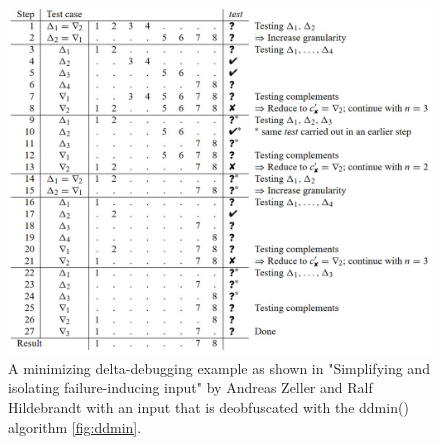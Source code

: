 \begin{figure}
	\centering
	\includegraphics[width=1.0\textwidth]{images/ddminExampleFromPaper5}
	\caption{A minimizing delta-debugging example as shown in "Simplifying and isolating failure-inducing input" by Andreas Zeller and Ralf Hildebrandt \cite{5zeller2002simplifyingIsolatingFailure-inducing} with an input that is deobfuscated with the ddmin() algorithm \ref{fig:ddmin}.}
	\label{fig:ddminExample}
\end{figure}

